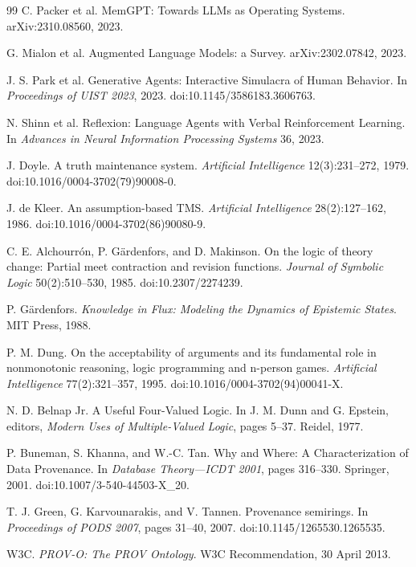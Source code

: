 \documentclass[11pt]{article}
\begin{document}
\begin{thebibliography}{99}
 C. Packer et al. MemGPT: Towards LLMs as Operating Systems. arXiv:2310.08560, 2023.

 G. Mialon et al. Augmented Language Models: a Survey. arXiv:2302.07842, 2023.

 J. S. Park et al. Generative Agents: Interactive Simulacra of Human Behavior. In \emph{Proceedings of UIST 2023}, 2023. doi:10.1145/3586183.3606763.

 N. Shinn et al. Reflexion: Language Agents with Verbal Reinforcement Learning. In \emph{Advances in Neural Information Processing Systems} 36, 2023.

 J. Doyle. A truth maintenance system. \emph{Artificial Intelligence} 12(3):231--272, 1979. doi:10.1016/0004-3702(79)90008-0.

 J. de Kleer. An assumption-based TMS. \emph{Artificial Intelligence} 28(2):127--162, 1986. doi:10.1016/0004-3702(86)90080-9.

 C. E. Alchourr\'on, P. G\"ardenfors, and D. Makinson. On the logic of theory change: Partial meet contraction and revision functions. \emph{Journal of Symbolic Logic} 50(2):510--530, 1985. doi:10.2307/2274239.

 P. G\"ardenfors. \emph{Knowledge in Flux: Modeling the Dynamics of Epistemic States}. MIT Press, 1988.

 P. M. Dung. On the acceptability of arguments and its fundamental role in nonmonotonic reasoning, logic programming and n-person games. \emph{Artificial Intelligence} 77(2):321--357, 1995. doi:10.1016/0004-3702(94)00041-X.

 N. D. Belnap Jr. A Useful Four-Valued Logic. In J. M. Dunn and G. Epstein, editors, \emph{Modern Uses of Multiple-Valued Logic}, pages 5--37. Reidel, 1977.

 P. Buneman, S. Khanna, and W.-C. Tan. Why and Where: A Characterization of Data Provenance. In \emph{Database Theory---ICDT 2001}, pages 316--330. Springer, 2001. doi:10.1007/3-540-44503-X\_20.

 T. J. Green, G. Karvounarakis, and V. Tannen. Provenance semirings. In \emph{Proceedings of PODS 2007}, pages 31--40, 2007. doi:10.1145/1265530.1265535.

 W3C. \emph{PROV-O: The PROV Ontology}. W3C Recommendation, 30 April 2013.


\end{thebibliography}
\end{document}
